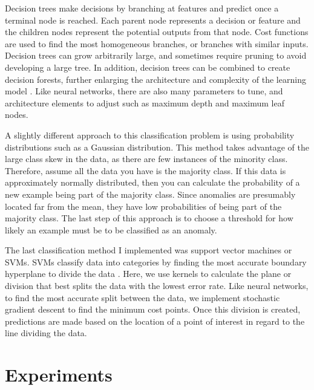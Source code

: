 \documentclass[midd]{thesis}
\begin{document}
Decision trees make decisions by branching at features and predict once a terminal node is reached. Each parent node represents a decision or feature and the children nodes represent the potential outputs from that node. Cost functions are used to find the most homogeneous branches, or branches with similar inputs. Decision trees can grow arbitrarily large, and sometimes require pruning to avoid developing a large tree. In addition, decision trees can be combined to create decision forests, further enlarging the architecture and complexity of the learning model \cite{Gupta}. Like neural networks, there are also many parameters to tune, and architecture elements to adjust such as maximum depth and maximum leaf nodes.

A slightly different approach to this classification problem is using probability distributions such as a Gaussian distribution. This method takes advantage of the large class skew in the data, as there are few instances of the minority class. Therefore, assume all the data you have is the majority class. If this data is approximately normally distributed, then you can calculate the probability of a new example being part of the majority class. Since anomalies are presumably located far from the mean, they have low probabilities of being part of the majority class. The last step of this approach is to choose a threshold for how likely an example must be to be classified as an anomaly. 

The last classification method I implemented was support vector machines or SVMs. SVMs classify data into categories by finding the most accurate boundary hyperplane to divide the data \cite{Brownlee}. Here, we use kernels to calculate the plane or division that best splits the data with the lowest error rate. Like neural networks, to find the most accurate split between the data, we implement stochastic gradient descent to find the minimum cost points. Once this division is created, predictions are made based on the location of a point of interest in regard to the line dividing the data. 

\section{Experiments}
\end{document}
